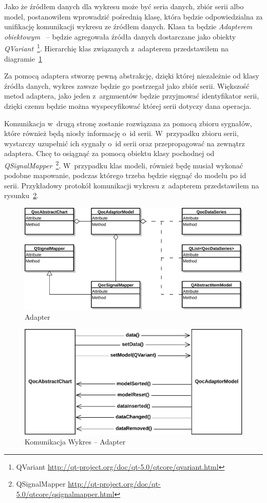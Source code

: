 Jako że źródłem danych dla wykresu może być seria danych, zbiór serii albo model, postanowiłem wprowadzić pośrednią klasę, która będzie odpowiedzialna za unifikację komunikacji wykresu ze źródłem danych. Klasa ta będzie \textit{Adapterem obiektowym}~\cite[141-151]{Patterns} -- będzie agregowała źródła danych dostarczane jako obiekty \textit{QVariant}~\footnote{QVariant \url{http://qt-project.org/doc/qt-5.0/qtcore/qvariant.html}}. Hierarchię klas związanych z~adapterem przedstawiłem na diagramie~\ref{rys:adapter:model}

Za pomocą adaptera stworzę pewną abstrakcję, dzięki której niezależnie od klasy źródła danych, wykres zawsze będzie go postrzegał jako zbiór serii. Większość metod adaptera, jako jeden z~argmuentów będzie przyjmować identyfikator serii, dzięki czemu będzie można wyspecyfikować  której serii dotyczy dana operacja. 

Komunikacja w~drugą stronę zostanie rozwiązana za pomocą zbioru sygnałów, które również będą niosły informację o~id serii. W~przypadku zbioru serii, wystarczy uzupełnić ich sygnały o~id serii oraz przepropagować na zewnątrz adaptera. Chcę to osiągnąć za pomocą obiektu klasy pochodnej od \textit{QSignalMapper}~\footnote{QSignalMapper \url{http://qt-project.org/doc/qt-5.0/qtcore/qsignalmapper.html}}. W~przypadku klas modeli, również będę musiał wykonać podobne mapowanie, podczas którego trzeba będzie sięgnąć do modelu po id serii. Przykładowy protokół komunikacji wykresu z~adapterem przedstawiłem na rysunku~\ref{rys:wykres:model}.

\begin{figure}
\centering
\caption{Adapter}\label{rys:adapter:model}
\includegraphics[scale=0.8]{img/adapter-model.pdf}
\end{figure}

\begin{figure}
\centering
\caption{Komunikacja Wykres -- Adapter}\label{rys:wykres:model}
\includegraphics[scale=0.8]{img/wykres-model.pdf}
\end{figure}

